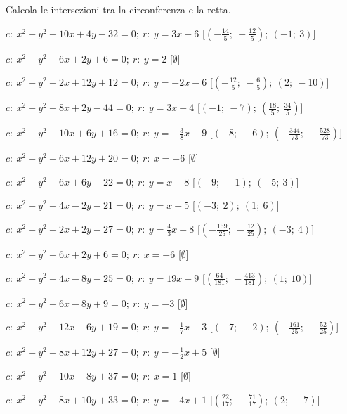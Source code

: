 \begin{esercizio}\label{ese:}
 Calcola le intersezioni tra la circonferenza e la retta.
 \begin{enumeratea}
  \item  \(c:~x^2 + y^2 -10x +4y -32 = 0;~r:~y = 3 x +6\)
   \hfill [\(\left (-\frac{14}{5};~-\frac{12}{5} \right );~\left (-1;~3 
\right )\)]
  \item  \(c:~x^2 + y^2 -6x +2y +6 = 0;~r:~y = 2\)
   \hfill [\(\emptyset\)]
  \item  \(c:~x^2 + y^2 +2x +12y +12 = 0;~r:~y = -2 x -6\)
   \hfill [\(\left (-\frac{12}{5};~-\frac{6}{5} \right );~\left (2;~-10 
\right )\)]
  \item  \(c:~x^2 + y^2 -8x +2y -44 = 0;~r:~y = 3 x -4\)
   \hfill [\(\left (-1;~-7 \right );~\left (\frac{18}{5};~\frac{34}{5} \right 
)\)]
  \item  \(c:~x^2 + y^2 +10x +6y +16 = 0;~r:~y = -\frac{3}{8} x -9\)
   \hfill [\(\left (-8;~-6 \right );~\left (-\frac{344}{73};~-\frac{528}{73} 
\right )\)]
  \item  \(c:~x^2 + y^2 -6x +12y +20 = 0;~r:~x = -6\)
   \hfill [\(\emptyset\)]
  \item  \(c:~x^2 + y^2 +6x +6y -22 = 0;~r:~y = x +8\)
   \hfill [\(\left (-9;~-1 \right );~\left (-5;~3 \right )\)]
  \item  \(c:~x^2 + y^2 -4x -2y -21 = 0;~r:~y = x +5\)
   \hfill [\(\left (-3;~2 \right );~\left (1;~6 \right )\)]
  \item  \(c:~x^2 + y^2 +2x +2y -27 = 0;~r:~y = \frac{4}{3} x +8\)
   \hfill [\(\left (-\frac{159}{25};~-\frac{12}{25} \right );~\left (-3;~4 
\right )\)]
  \item  \(c:~x^2 + y^2 +6x +2y +6 = 0;~r:~x = -6\)
   \hfill [\(\emptyset\)]
  \item  \(c:~x^2 + y^2 +4x -8y -25 = 0;~r:~y = 19 x -9\)
   \hfill [\(\left (\frac{64}{181};~-\frac{413}{181} \right );~\left (1;~10 
\right )\)]
  \item  \(c:~x^2 + y^2 +6x -8y +9 = 0;~r:~y = -3\)
   \hfill [\(\emptyset\)]
  \item  \(c:~x^2 + y^2 +12x -6y +19 = 0;~r:~y = -\frac{1}{7} x -3\)
   \hfill [\(\left (-7;~-2 \right );~\left (-\frac{161}{25};~-\frac{52}{25} 
\right )\)]
  \item  \(c:~x^2 + y^2 -8x +12y +27 = 0;~r:~y = -\frac{1}{2} x +5\)
   \hfill [\(\emptyset\)]
  \item  \(c:~x^2 + y^2 -10x -8y +37 = 0;~r:~x = 1\)
   \hfill [\(\emptyset\)]
  \item  \(c:~x^2 + y^2 -8x +10y +33 = 0;~r:~y = -4 x +1\)
   \hfill [\(\left (\frac{22}{17};~-\frac{71}{17} \right );~\left (2;~-7 
\right )\)]
 \end{enumeratea}
\end{esercizio}

